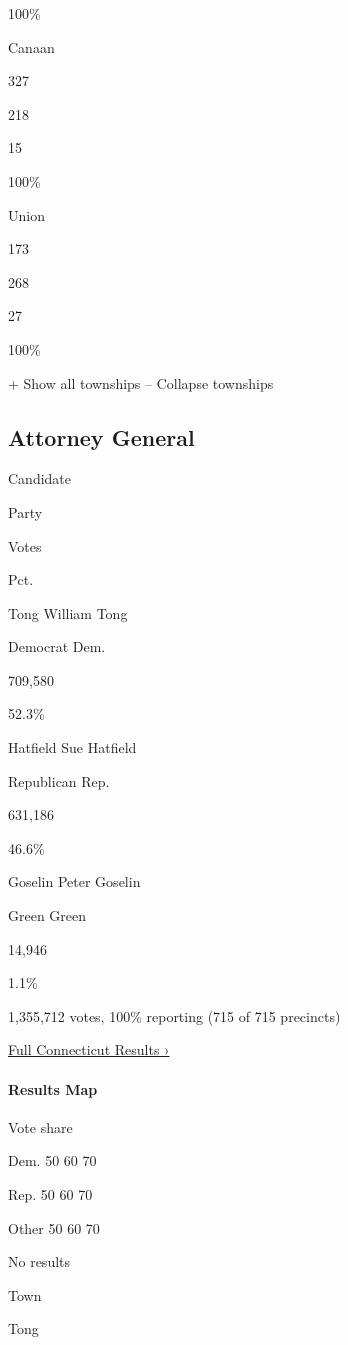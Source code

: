 100\%

Canaan

327

218

15

100\%

Union

173

268

27

100\%

+ Show all townships -- Collapse townships

\hypertarget{attorney-general}{%
\subsection{Attorney General}\label{attorney-general}}

Candidate

Party

Votes

Pct.

 Tong William Tong

Democrat Dem.

709,580

52.3\%

 Hatfield Sue Hatfield

Republican Rep.

631,186

46.6\%

 Goselin Peter Goselin

Green Green

14,946

1.1\%

1,355,712 votes, 100\% reporting (715 of 715 precincts)

\href{https://www.nytimes3xbfgragh.onion/interactive/2018/11/06/us/elections/results-connecticut-elections.html}{Full
Connecticut Results ›}

\hypertarget{results-map-2}{%
\paragraph{Results Map}\label{results-map-2}}

Vote share

Dem. 50 60 70

Rep. 50 60 70

Other 50 60 70

No results

Town

Tong

